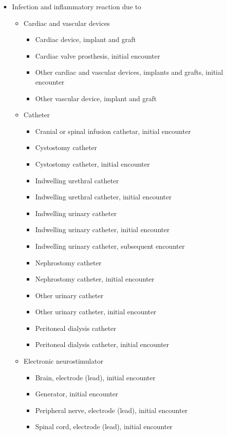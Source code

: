 \begin{itemize}
    \item Infection and inflammatory reaction due to
    \begin{itemize}
        
        \item Cardiac and vascular devices
        \begin{itemize}
            \item Cardiac device, implant and graft
            \item Cardiac valve prosthesis, initial encounter
            \item Other cardiac and vascular devices, implants and grafts, initial encounter
            \item Other vascular device, implant and graft
        \end{itemize}
        
        \item Catheter
        \begin{itemize}
            \item Cranial or spinal infusion cathetar, initial encounter
            \item Cystostomy catheter
            \item Cystostomy catheter, initial encounter
            \item Indwelling urethral catheter
            \item Indwelling urethral catheter, initial encounter
            \item Indwelling urinary catheter
            \item Indwelling urinary catheter, initial encounter
            \item Indwelling urinary catheter, subsequent encounter
            \item Nephrostomy catheter
            \item Nephrostomy catheter, initial encounter
            \item Other urinary catheter
            \item Other urinary catheter, initial encounter
            \item Peritoneal dialysis catheter
            \item Peritoneal dialysis catheter, initial encounter
        \end{itemize}
        
        \item Electronic neurostimulator
        \begin{itemize}
            \item Brain, electrode (lead), initial encounter
            \item Generator, initial encounter
            \item Peripheral nerve, electrode (lead), initial encounter
            \item Spinal cord, electrode (lead), initial encounter
        \end{itemize}
        

\end{itemize}
\end{itemize}
